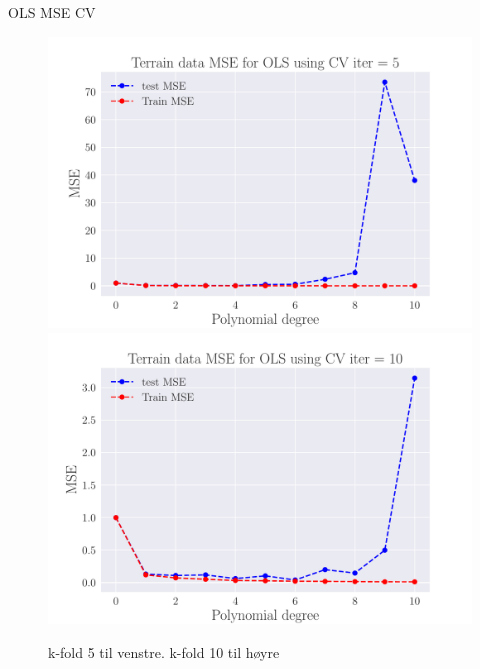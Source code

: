 \documentclass[reprint,english,notitlepage,aps,nobalancelastpage,nofootinbib]{revtex4-1}  %
\begin{document}
OLS MSE CV
\begin{figure}[H]
	\includegraphics[width=\linewidth]{SRTM_MSE_OLS_n50_pol10_CV_re5.pdf}
	\endminipage\hfill
	\includegraphics[width=\linewidth]{SRTM_MSE_OLS_n50_pol10_CV_re10.pdf}
	\endminipage
	\caption{k-fold 5 til venstre. k-fold 10 til høyre}
  \label{fig:terrain_OLS_MSE_CV}
\end{figure}
\end{document}

